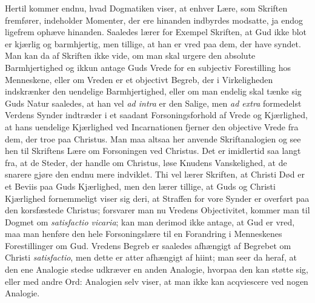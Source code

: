 \documentclass[12pt]{book}
\newcommand{\opage}[1]{\marginnote{\footnotesize\textit{[#1]}}}
\begin{document}
Hertil kommer endnu, hvad Dogmatiken viser, at enhver Lære, som Skriften
fremfører, indeholder Momenter, der ere hinanden indbyrdes modsatte, ja endog
ligefrem ophæve hinanden. Saaledes lærer for Exempel Skriften, at Gud ikke
\opage{112} blot er kjærlig og barmhjertig, men tillige, at han er vred paa dem, der have
syndet. Man kan da af Skriften ikke vide, om man skal urgere den absolute
Barmhjertighed og ikkun antage Guds Vrede for en subjectiv Forestilling hos
Menneskene, eller om Vreden er et objectivt Begreb, der i Virkeligheden
indskrænker den uendelige Barmhjertighed, eller om man endelig skal tænke sig
Guds Natur saaledes, at han vel \textit{ad intra} er den Salige, men
\textit{ad extra} formedelst Verdens Synder indtræder i et saadant
Forsoningsforhold af Vrede og Kjærlighed, at hans uendelige Kjærlighed ved
Incarnationen fjerner den objective Vrede fra dem, der troe paa Christus. Man
maa altsaa her anvende Skriftanalogien og see hen til Skriftens Lære om
Forsoningen ved Christus. Det er imidlertid saa langt fra, at de Steder, der
handle om Christus, løse Knudens Vanskelighed, at de snarere gjøre den endnu
mere indviklet. Thi vel lærer Skriften, at Christi Død er et Beviis paa Guds
Kjærlighed, men den lærer tillige, at Guds og Christi Kjærlighed fornemmeligt
viser sig deri, at Straffen for vore Synder er overført paa den korsfæstede
Christus; forsvarer man nu Vredens Objectivitet, kommer man til Dogmet om
\textit{satisfactio vicaria}; kan man derimod ikke antage, at Gud er vred, maa
man henføre den hele Forsoningslære til en Forandring i Menneskenes
Forestillinger om Gud. Vredens Begreb er saaledes afhængigt af Begrebet om
Christi \textit{satisfactio}, men dette er atter afhængigt af hiint; man seer
da heraf, at den ene Analogie stedse udkræver en anden Analogie, hvorpaa den
kan støtte sig, eller med andre Ord: Analogien selv viser, at man ikke kan
acqviescere ved nogen Analogie.
\end{document}
